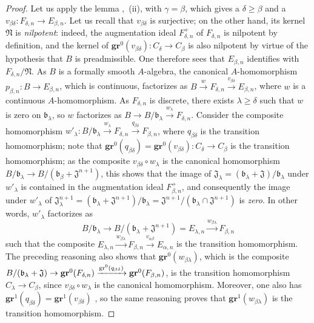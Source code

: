 \begin{proof}
Let us apply the lemma ,~{\rm(ii)}, with $\gamma=\beta$, which gives a
$\delta\geq\beta$ and a
$v_{\beta\delta}:F_{\delta,n}\to E_{\beta,n}$. Let us recall that
$v_{\beta\delta}$ is surjective; on the other hand, its kernel $\mathfrak N$ is
\emph{nilpotent}: indeed, the augmentation ideal $F_{\delta,n}^+$ of
$F_{\delta,n}$ is nilpotent by definition, and the kernel of
$\mathbf{gr}^0(v_{\beta\delta}):C_\delta\to C_\beta$ is also nilpotent by virtue of
the hypothesis that $B$ is preadmissible. One therefore sees that $E_{\beta,n}$
identifies with $F_{\delta,n}/\mathfrak N$. As $B$ is a formally smooth
$A$-algebra, the canonical $A$-homomorphism
$p_{\beta,n}:B\to E_{\beta,n}$, which is continuous, factorizes as
$B\xrightarrow{w}F_{\delta,n}\xrightarrow{v_{\beta\delta}}E_{\beta,n}$, where
$w$ is a continuous $A$-homomorphism. As $F_{\delta,n}$ is discrete, there
exists $\lambda\geq\delta$ such that $w$ is zero on $\mathfrak{b}_\lambda$,
so $w$ factorizes as
$B\to B/\mathfrak{b}_\lambda\xrightarrow{w_\lambda}F_{\delta,n}$. Consider
the composite homomorphism
$w'_\lambda:B/\mathfrak{b}_\lambda\xrightarrow{w_\lambda}F_{\delta,n}
\xrightarrow{q_{\beta\delta}}F_{\beta,n}$, where $q_{\beta\delta}$ is
the transition homomorphism; note that
$\mathbf{gr}^0(q_{\beta\delta})=\mathbf{gr}^0(v_{\beta\delta}):C_\delta\to C_\beta$ is
the transition homomorphism; as the composite
$v_{\beta\delta}\circ w_\lambda$ is the canonical homomorphism
$B/\mathfrak{b}_\lambda\to
B/(\mathfrak{b}_\beta+\mathfrak{J}^{n+1})$, this shows that the image of
$\mathfrak{J}_\lambda=(\mathfrak{b}_\lambda+\mathfrak{J})/\mathfrak{b}_\lambda$
under $w'_\lambda$ is contained in the augmentation ideal
$F_{\beta,n}^+$, and consequently the image under $w'_\lambda$ of
$\mathfrak{J}_\lambda^{n+1}=(\mathfrak{b}_\lambda+\mathfrak{J}^{n+1})/
\mathfrak{b}_\lambda=\mathfrak{J}^{n+1}/(\mathfrak{b}_\lambda\cap\mathfrak{J}^{n+1})$ is \emph{zero}. In other words,
$w'_\lambda$ factorizes as
\[
  B/\mathfrak{b}_\lambda\to
  B/(\mathfrak{b}_\lambda+\mathfrak{J}^{n+1})=E_{\lambda,n}
  \xrightarrow{w_{\beta\lambda}}F_{\beta,n}
\]
such that the composite
$E_{\lambda,n}\xrightarrow{w_{\beta\lambda}}F_{\beta,n}
\xrightarrow{v_{\alpha\beta}}E_{\alpha,n}$ is the transition homomorphism.
The preceding reasoning also shows that $\mathbf{gr}^0(w_{\beta\lambda})$, which is
the composite
$B/(\mathfrak{b}_\lambda+\mathfrak{J})\to\mathbf{gr}^0(F_{\delta,n})
\xrightarrow{\operatorname{gr}^0(q_{\beta\delta})}\mathbf{gr}^0(F_{\beta,n})$, is the transition
homomorphism $C_\lambda\to C_\beta$, since
$v_{\beta\delta}\circ w_\lambda$ is the canonical homomorphism. Moreover, one also has
$\mathbf{gr}^1(q_{\beta\delta})=\mathbf{gr}^1(v_{\beta\delta})$ , so the same
reasoning proves that $\mathbf{gr}^1(w_{\beta\lambda})$ is the transition
homomorphism.
\end{proof}

